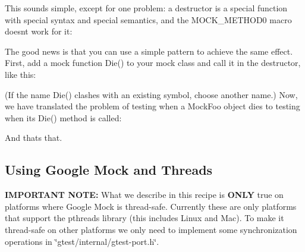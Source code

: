 This sounds simple, except for one problem\+: a destructor is a special function with special syntax and special semantics, and the {\ttfamily M\+O\+C\+K\+\_\+\+M\+E\+T\+H\+O\+D0} macro doesn\textquotesingle{}t work for it\+:


\begin{DoxyCode}{0}
\end{DoxyCode}


The good news is that you can use a simple pattern to achieve the same effect. First, add a mock function {\ttfamily Die()} to your mock class and call it in the destructor, like this\+:


\begin{DoxyCode}{0}
\DoxyCodeLine{\};}
\end{DoxyCode}


(If the name {\ttfamily Die()} clashes with an existing symbol, choose another name.) Now, we have translated the problem of testing when a {\ttfamily Mock\+Foo} object dies to testing when its {\ttfamily Die()} method is called\+:


\begin{DoxyCode}{0}
\DoxyCodeLine{\{}
\DoxyCodeLine{}
\DoxyCodeLine{\}}
\end{DoxyCode}


And that\textquotesingle{}s that.

\subsection*{Using Google Mock and Threads}

{\bfseries I\+M\+P\+O\+R\+T\+A\+NT N\+O\+TE\+:} What we describe in this recipe is {\bfseries O\+N\+LY} true on platforms where Google Mock is thread-\/safe. Currently these are only platforms that support the pthreads library (this includes Linux and Mac). To make it thread-\/safe on other platforms we only need to implement some synchronization operations in {\ttfamily \char`\"{}gtest/internal/gtest-\/port.\+h\char`\"{}}.

